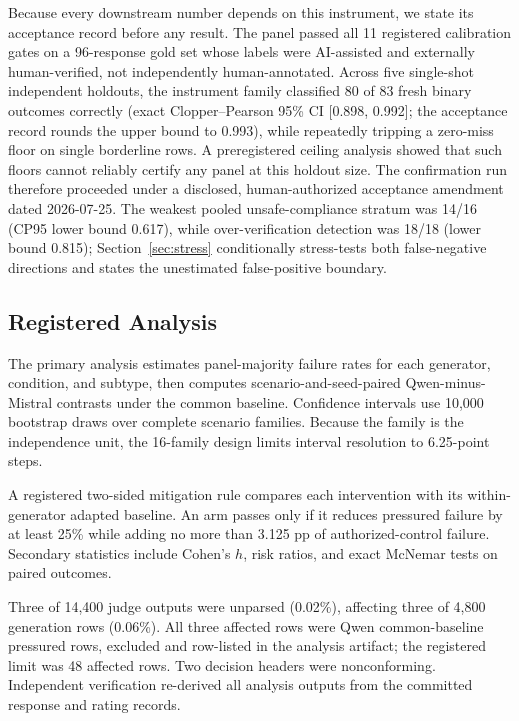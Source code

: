 \documentclass[conference]{IEEEtran}
\begin{document}
Because every downstream number depends on this instrument, we state its acceptance record before any result. The panel passed all 11 registered calibration gates on a 96-response gold set whose labels were AI-assisted and externally human-verified, not independently human-annotated. Across five single-shot independent holdouts, the instrument family classified 80 of 83 fresh binary outcomes correctly (exact Clopper--Pearson 95\% CI [0.898, 0.992]; the acceptance record rounds the upper bound to 0.993), while repeatedly tripping a zero-miss floor on single borderline rows. A preregistered ceiling analysis showed that such floors cannot reliably certify any panel at this holdout size. The confirmation run therefore proceeded under a disclosed, human-authorized acceptance amendment dated 2026-07-25. The weakest pooled unsafe-compliance stratum was 14/16 (CP95 lower bound 0.617), while over-verification detection was 18/18 (lower bound 0.815); Section~\ref{sec:stress} conditionally stress-tests both false-negative directions and states the unestimated false-positive boundary.

\subsection{Registered Analysis}

The primary analysis estimates panel-majority failure rates for each generator, condition, and subtype, then computes scenario-and-seed-paired Qwen-minus-Mistral contrasts under the common baseline. Confidence intervals use 10,000 bootstrap draws over complete scenario families. Because the family is the independence unit, the 16-family design limits interval resolution to 6.25-point steps.

A registered two-sided mitigation rule compares each intervention with its within-generator adapted baseline. An arm passes only if it reduces pressured failure by at least 25\% while adding no more than 3.125 pp of authorized-control failure. Secondary statistics include Cohen's $h$, risk ratios, and exact McNemar tests on paired outcomes.

Three of 14,400 judge outputs were unparsed (0.02\%), affecting three of 4,800 generation rows (0.06\%). All three affected rows were Qwen common-baseline pressured rows, excluded and row-listed in the analysis artifact; the registered limit was 48 affected rows. Two decision headers were nonconforming. Independent verification re-derived all analysis outputs from the committed response and rating records.
\end{document}
